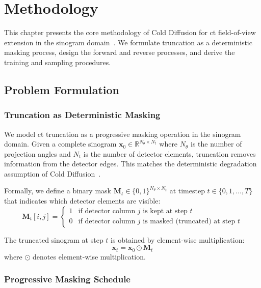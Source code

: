 \chapter{Methodology}
\label{ch:methodology}

This chapter presents the core methodology of Cold Diffusion for \gls{ct} field-of-view extension in the sinogram domain~\cite{bansal2022cold}. We formulate truncation as a deterministic masking process, design the forward and reverse processes, and derive the training and sampling procedures.

\section{Problem Formulation}

\subsection{Truncation as Deterministic Masking}

We model \gls{ct} truncation as a progressive masking operation in the sinogram domain. Given a complete sinogram $\mathbf{x}_0 \in \mathbb{R}^{N_\theta \times N_t}$ where $N_\theta$ is the number of projection angles and $N_t$ is the number of detector elements, truncation removes information from the detector edges. This matches the deterministic degradation assumption of Cold Diffusion~\cite{bansal2022cold}.

Formally, we define a binary mask $\mathbf{M}_t \in \{0,1\}^{N_\theta \times N_t}$ at timestep $t \in \{0, 1, \ldots, T\}$ that indicates which detector elements are visible:
%
\begin{equation}
\mathbf{M}_t[i,j] = \begin{cases}
1 & \text{if detector column } j \text{ is kept at step } t \\
0 & \text{if detector column } j \text{ is masked (truncated) at step } t
\end{cases}
\end{equation}

The truncated sinogram at step $t$ is obtained by element-wise multiplication:
%
\begin{equation}
\mathbf{x}_t = \mathbf{x}_0 \odot \mathbf{M}_t
\label{eq:truncation_operation}
\end{equation}
%
where $\odot$ denotes element-wise multiplication.

\subsection{Progressive Masking Schedule}

